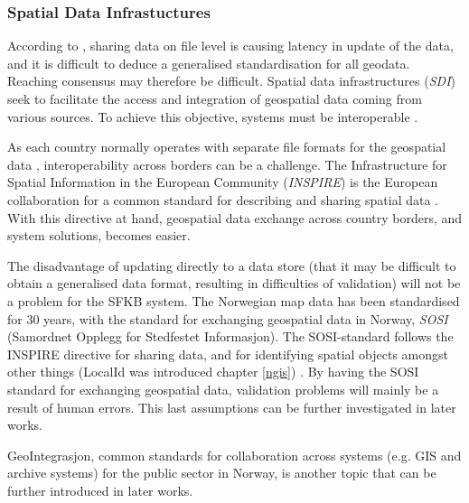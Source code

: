 \subsubsection{Spatial Data Infrastuctures}

According to \cite{Peng2005}, sharing data on file level is causing latency in update of the data, and it is difficult to deduce a generalised standardisation for all geodata. Reaching consensus may therefore be difficult.  Spatial data infrastructures (\textit{SDI}) seek to facilitate the access and integration of geospatial data coming from various sources. To achieve this objective, systems must be interoperable \citep{giuliani2013}. 

As each country normally operates with separate file formats for the geospatial data \citep{Frenvik2017a}, interoperability across borders can be a challenge. The Infrastructure for Spatial Information in the European Community (\textit{INSPIRE}) is the European collaboration for a common standard for describing and sharing spatial data \citep{INSPIRE}. With this directive at hand, geospatial data exchange across country borders, and system solutions, becomes easier. 



The disadvantage of updating directly to a data store (that it may be difficult to obtain a generalised data format, resulting in difficulties of validation) will not be a problem for the SFKB system. The Norwegian map data has been standardised for 30 years, with the standard for exchanging geospatial data in Norway, \textit{SOSI} (Samordnet Opplegg for Stedfestet Informasjon). The SOSI-standard follows the INSPIRE directive for sharing data, and for identifying spatial objects amongst other things (LocalId was introduced chapter \ref{ngis}) \citep{Kartverket2012, Hokstad2016}. By having the SOSI standard for exchanging geospatial data, validation problems will mainly be a result of human errors. This last assumptions can be further investigated in later works. 

GeoIntegrasjon, common standards for collaboration across systems (e.g. GIS and archive systems) for the public sector in Norway, is another topic that can be further introduced in later works. 



